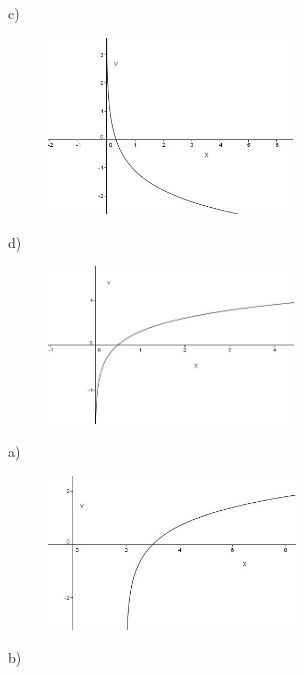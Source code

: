 \begin{respostas}{7}
c)

\begin{figure}[H]
	\begin{Center}
		\includegraphics[width=2.55in,height=1.84in]{capitulos/logaritmos_e_funcao_logaritmica/media/image28.JPG}
	\end{Center}
\end{figure}

d)

\begin{figure}[H]
	\begin{Center}
		\includegraphics[width=2.56in,height=1.64in]{capitulos/logaritmos_e_funcao_logaritmica/media/image29.JPG}
	\end{Center}
\end{figure}

	\ansitem{} a)

\begin{figure}[H]
	\begin{Center}
		\includegraphics[width=2.58in,height=1.6in]{capitulos/logaritmos_e_funcao_logaritmica/media/image30.JPG}
	\end{Center}
\end{figure}

b)


\end{respostas}
